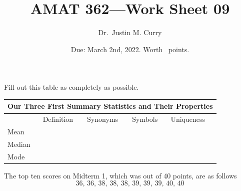 \documentclass[addpoints,12pt]{exam}
\title{\vspace{-1in} AMAT 362---Work Sheet 09}
\date{Due: March 2nd, 2022. Worth \numpoints\ points.}
\author{Dr.~Justin M. Curry}
\begin{document}
\maketitle


\begin{questions}

\question[3] Fill out this table as completely as possible.
\begin{center}
\begin{tabular}{ |p{1.5cm}|p{5cm}|p{3cm}|p{2cm}|p{2cm}| }
\hline
\multicolumn{5}{|c|}{Our Three First Summary Statistics and Their Properties} \\
\hline
& Definition & Synonyms &Symbols & Uniqueness \\
\hline
Mean & \vspace{.75in} & & & \\
%
\hline
Median & \vspace{.75in} & & & \\
\hline
Mode &  \vspace{.75in} & & & \\
\hline
\end{tabular}
\end{center}

\question[6] The top ten scores on Midterm 1, which was out of 40 points, are as follows
\[
	36, \, 36, \, 38, \, 38, \, 38, \, 39, \, 39, \, 39, \,40, \, 40 
\]

\noaddpoints
{}
\end{questions}
\end{document}
